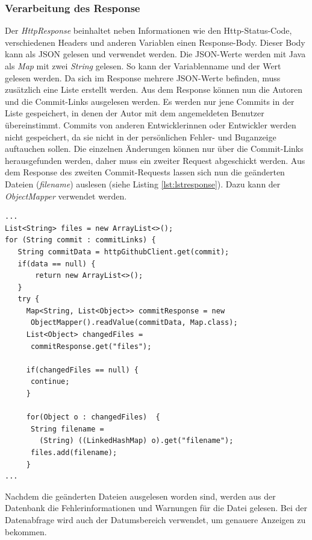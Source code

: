 \subsubsection{Verarbeitung des Response}
Der \textit{HttpResponse} beinhaltet neben Informationen wie den Http-Status-Code, verschiedenen Headers und anderen Variablen einen Response-Body. Dieser Body kann als JSON gelesen und verwendet werden. Die JSON-Werte werden mit Java als \textit{Map} mit zwei \textit{String} gelesen. So kann der Variablenname und der Wert gelesen werden. Da sich im Response mehrere JSON-Werte befinden, muss zusätzlich eine Liste erstellt werden. Aus dem Response können nun die Autoren und die Commit-Links ausgelesen werden. Es werden nur jene Commits in der Liste gespeichert, in denen der Autor mit dem angemeldeten Benutzer übereinstimmt. Commits von anderen Entwicklerinnen oder Entwickler werden nicht gespeichert, da sie nicht in der persönlichen Fehler- und Buganzeige auftauchen sollen. Die einzelnen Änderungen können nur über die Commit-Links herausgefunden werden, daher muss ein zweiter Request abgeschickt werden. Aus dem Response des zweiten Commit-Requests lassen sich nun die geänderten Dateien (\textit{filename}) auslesen (siehe Listing \ref{lst:lstresponse}). Dazu kann der \textit{ObjectMapper} verwendet werden.
\lstset{
  caption=[Auslesen der geänderten Files aus der Github-API.]{Auslesen der geänderten Files aus der Github-API. Die Links für die Commits müssen in einem eigenen Request vom Repository ausgelesen werden.}, 
  basicstyle=\small\ttfamily, 
  label=lst:lstresponse, 
  language=Java,
  frame=single,
  breaklines=true, %
  postbreak=\mbox{\textcolor{red}{$\hookrightarrow$}\space},
}
\begin{samepage}%
	\begin{lstlisting}[float=tbhp]
...
List<String> files = new ArrayList<>();
for (String commit : commitLinks) {
   String commitData = httpGithubClient.get(commit);
   if(data == null) {
       return new ArrayList<>();
   }
   try {
     Map<String, List<Object>> commitResponse = new   
      ObjectMapper().readValue(commitData, Map.class);
     List<Object> changedFiles = 
      commitResponse.get("files");

     if(changedFiles == null) {
      continue;
     }

     for(Object o : changedFiles)  {
      String filename = 
        (String) ((LinkedHashMap) o).get("filename");
      files.add(filename);
     }
...     
	\end{lstlisting}
\end{samepage}
Nachdem die geänderten Dateien ausgelesen worden sind, werden aus der Datenbank die Fehlerinformationen und Warnungen für die Datei gelesen. Bei der Datenabfrage wird auch der Datumsbereich verwendet, um genauere Anzeigen zu bekommen.
